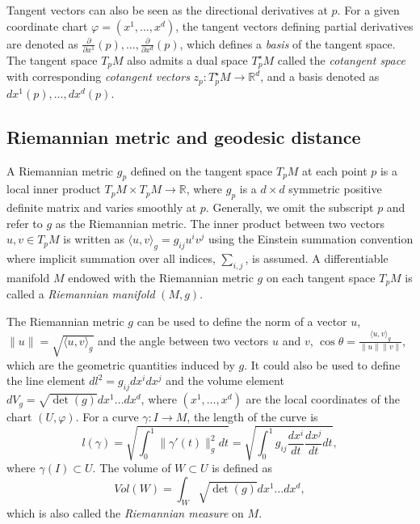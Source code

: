 \documentclass[11pt,a4paper,]{article}
\begin{document}
Tangent vectors can also be seen as the directional derivatives at \(p\). For a given coordinate chart \(\varphi=(x^1,\dots,x^d)\), the tangent vectors defining partial
derivatives are denoted as \(\frac{\partial}{\partial x^1}(p),\dots,\frac{\partial}{\partial x^d}(p)\), which defines a \emph{basis} of the tangent space.
The tangent space \(T_pM\) also admits a dual space \(T^\star_pM\) called the \emph{cotangent space} with corresponding \emph{cotangent vectors}
\(z_p: T^\star_pM \rightarrow \mathbb{R}^d\), and a basis denoted as \(dx^1(p),\dots,dx^d(p)\).

\hypertarget{riemannian-metric-and-geodesic-distance}{%
\subsection{Riemannian metric and geodesic distance}\label{riemannian-metric-and-geodesic-distance}}

A Riemannian metric \(g_p\) defined on the tangent space \(T_pM\) at each point \(p\) is a local inner product \(T_pM \times T_pM \rightarrow \mathbb{R}\), where \(g_p\) is a \(d\times d\) symmetric positive definite matrix and varies smoothly at \(p\). Generally, we
omit the subscript \(p\) and refer to \(g\) as the Riemannian metric. The inner product between two vectors \(u, v \in T_pM\) is written as \(\langle u, v \rangle_g = g_{ij}u^iv^j\) using the Einstein summation convention where implicit summation over all indices, \(\sum_{i,j}\), is assumed. A differentiable manifold \(M\) endowed with the Riemannian metric \(g\) on each tangent space \(T_pM\) is called a \emph{Riemannian manifold} \((M,g)\).

The Riemannian metric \(g\) can be used to define the norm of a vector \(u\), \(\|u\| = \sqrt{\langle u,v \rangle_g}\) and the angle between two vectors \(u\) and \(v\), \(\cos\theta = \frac{\langle u,v \rangle_g}{\|u\| \|v\|}\), which are the geometric quantities induced by \(g\). It could also be used to define the line element \(dl^2 = g_{ij}dx^i dx^j\) and the volume element \(dV_g = \sqrt{\det(g)}dx^1 \dots dx^d\), where \((x^1,\dots,x^d)\) are the local coordinates of the chart \((U, \varphi)\).
For a curve \(\gamma: I \rightarrow M\), the length of the curve is
\[
l(\gamma) = \sqrt{\int_0^1 \|\gamma\prime(t)\|^2_g dt} = \sqrt{\int_0^1 g_{ij} \frac{dx^i}{dt} \frac{dx^j}{dt} dt},
\]
where \(\gamma(I) \subset U\). The volume of \(W \subset U\) is defined as
\[
Vol(W) = \int_W \sqrt{\det(g)}dx^1 \dots dx^d,
\]
which is also called the \emph{Riemannian measure} on \(M\).
\end{document}
